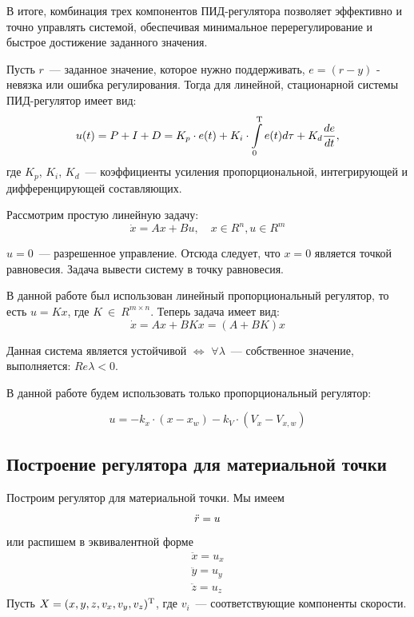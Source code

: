 \documentclass[a4paper,12pt]{article}
\begin{document}
В итоге, комбинация трех компонентов ПИД-регулятора позволяет эффективно и точно управлять системой, обеспечивая минимальное перерегулирование и быстрое достижение заданного значения.

Пусть $r$~--- заданное значение, которое нужно поддерживать, $e = (r-y)$ - невязка или ошибка регулирования. Тогда для линейной, стационарной системы ПИД-регулятор имеет вид:
\begin{equation}
    u(t) = P + I + D = K_p\cdot e(t) + K_i \cdot \int\limits_0^\text{\textup{T}} e(t) d\tau + K_d \frac{de}{dt},
\end{equation} 
где $K_p$, $K_i$, $K_d$~--- коэффициенты усиления пропорциональной, интегрирующей и дифференцирующей составляющих.

Рассмотрим простую линейную задачу:
\begin{equation}\label{PID}
    \Dot{x} = Ax + Bu,\quad x \in R^n, u \in R^m
\end{equation}

$u = 0 $~--- разрешенное управление. Отсюда следует, что $x = 0$ является точкой равновесия. Задача вывести систему в точку равновесия.

В данной работе был использован линейный пропорциональный регулятор, то есть $u = Kx$, где $K~\in~R^{m\times n}$.
Теперь задача имеет вид:
\begin{equation}\label{PID_lin}
    \Dot{x} = Ax + BKx = (A+BK)x
\end{equation}

Данная система является устойчивой $\Longleftrightarrow$ $\forall \lambda$~--- собственное значение, выполняется: $Re\lambda < 0$.

В данной работе будем использовать только пропорциональный регулятор:

$$u = -k_x \cdot (x - x_w) - k_V\cdot (V_x - V_{x,w})$$


\subsection{Построение регулятора для материальной точки}

Построим регулятор для материальной точки. Мы имеем
\begin{equation*}
    \Ddot{r} = u
\end{equation*}
или распишем в эквивалентной форме
\begin{align*}
    \ddot{x} = u_x \\
    \ddot{y} = u_y \\
    \ddot{z} = u_z
\end{align*}
Пусть $X = (x,y,z,v_x,v_y,v_z)^\text{\textup{T}}$, где $v_i$~--- соответствующие компоненты скорости.
\end{document}
